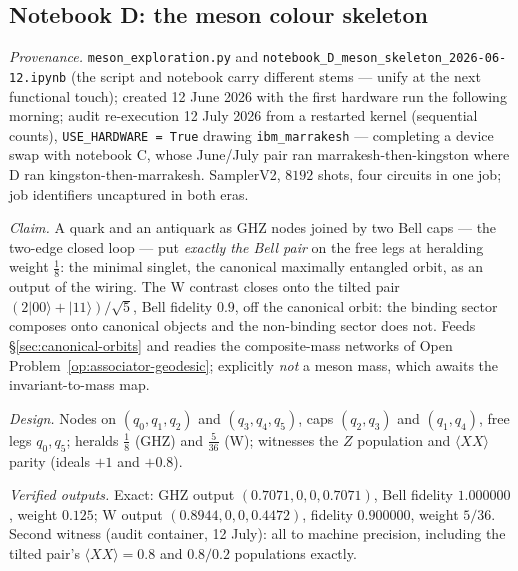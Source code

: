 \subsection{Notebook D: the meson colour skeleton}
\label{app:nb-D}

\emph{Provenance.} \texttt{meson\_exploration.py} and
\texttt{notebook\_D\_meson\_skeleton\_2026-06-12.ipynb} (the script and notebook carry different
stems --- unify at the next functional touch); created 12 June 2026 with the first hardware run
the following morning; audit re-execution 12 July 2026 from a restarted kernel (sequential
counts), \texttt{USE\_HARDWARE = True} drawing \texttt{ibm\_marrakesh} --- completing a device
swap with notebook C, whose June/July pair ran marrakesh-then-kingston where D ran
kingston-then-marrakesh. SamplerV2, $8192$ shots, four circuits in one job; job identifiers
uncaptured in both eras.

\emph{Claim.} A quark and an antiquark as GHZ nodes joined by two Bell caps --- the two-edge
closed loop --- put \emph{exactly the Bell pair} on the free legs at heralding weight $\tfrac18$:
the minimal singlet, the canonical maximally entangled orbit, as an output of the wiring. The W
contrast closes onto the tilted pair $(2\lvert00\rangle + \lvert11\rangle)/\sqrt5$, Bell fidelity
$0.9$, off the canonical orbit: the binding sector composes onto canonical objects and the
non-binding sector does not. Feeds \S\ref{sec:canonical-orbits} and readies the composite-mass
networks of Open Problem~\ref{op:associator-geodesic}; explicitly \emph{not} a meson mass, which
awaits the invariant-to-mass map.

\emph{Design.} Nodes on $(q_{0},q_{1},q_{2})$ and $(q_{3},q_{4},q_{5})$, caps $(q_{2},q_{3})$
and $(q_{1},q_{4})$, free legs $q_{0}, q_{5}$; heralds $\tfrac18$ (GHZ) and $\tfrac{5}{36}$ (W);
witnesses the $Z$ population and $\langle XX\rangle$ parity (ideals $+1$ and $+0.8$).

\emph{Verified outputs.} Exact: GHZ output $(0.7071, 0, 0, 0.7071)$, Bell fidelity $1.000000$,
weight $0.125$; W output $(0.8944, 0, 0, 0.4472)$, fidelity $0.900000$, weight $5/36$. Second
witness (audit container, 12 July): all to machine precision, including the tilted pair's
$\langle XX\rangle = 0.8$ and $0.8/0.2$ populations exactly.

